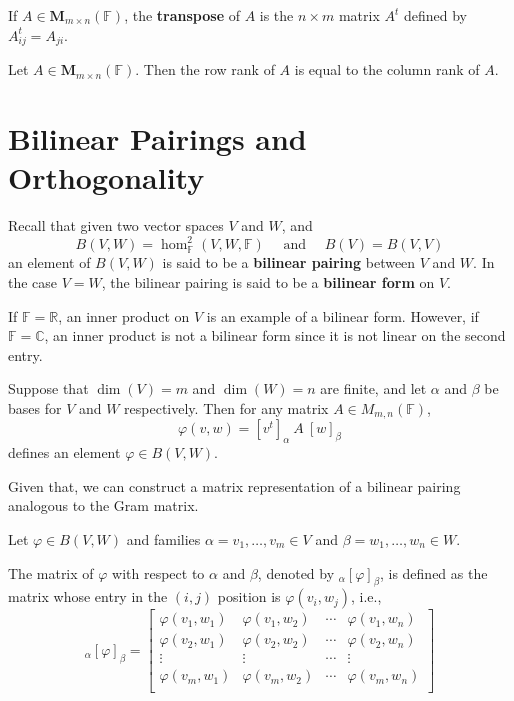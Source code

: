 \begin{definition}[Transpose]
	If $A \in \textbf{M}_{m \times n}(\mathbb{F})$, the \textbf{transpose} of $A$ is the $n \times m$ matrix $A^t$ defined by $A_{ij}^t = A_{ji}$.
\end{definition}

\begin{theorem}
	Let $A \in \textbf{M}_{m \times n}(\mathbb{F})$. Then the row rank of $A$ is equal to the column rank of $A$.
\end{theorem}

\section{Bilinear Pairings and Orthogonality}

Recall that given two vector spaces $V$ and $W$, and 
\[
  B(V,W) = \hom_{\mathbb{F}}^2 (V,W, \mathbb{F}) \quad \text{ and } \quad B(V) = B(V,V)
\]
an element of $B(V,W)$ is said to be a \textbf{bilinear pairing} between $V$ and $W$. In the case $V = W$, the bilinear pairing is said to be a \textbf{bilinear form} on $V$. 

If $\mathbb{F} = \mathbb{R}$, an inner product on $V$ is an example of a bilinear form. However, if $\mathbb{F} = \mathbb{C}$, an inner product is not a bilinear form since it is not linear on the second entry.

\begin{example}
  Suppose that $\dim(V) = m$ and $\dim(W) = n$ are finite, and let $\alpha$ and $\beta$ be bases for $V$ and $W$ respectively. Then for any matrix $A \in M_{m,n}(\mathbb{F})$, 
  \[
    \varphi(v,w) = [v^t]_\alpha ~A ~[w]_\beta 
  \]
  defines an element $\varphi \in B(V,W)$.
\end{example}

Given that, we can construct a matrix representation of a bilinear pairing analogous to the Gram matrix.

\begin{definition}
Let $\varphi \in B(V,W)$ and families $\alpha = v_1, \ldots, v_m \in V$ and $\beta = w_1, \ldots, w_n \in W$. 

The matrix of $\varphi$ with respect to $\alpha$ and $\beta$, denoted by ${}_\alpha [\varphi]_\beta$, is defined as the matrix whose entry in the $(i,j)$ position is $\varphi(v_i, w_j)$, i.e.,
\[
  {}_\alpha [\varphi]_\beta = \begin{bmatrix}
    \varphi(v_1, w_1) & \varphi(v_1, w_2) & \cdots & \varphi(v_1, w_n) \\
    \varphi(v_2, w_1) & \varphi(v_2, w_2) & \cdots & \varphi(v_2, w_n) \\
    \vdots & \vdots & \cdots & \vdots \\
    \varphi(v_m, w_1) & \varphi(v_m, w_2) & \cdots & \varphi(v_m, w_n) \\
  \end{bmatrix}
\]
\end{definition}

